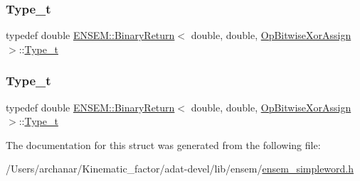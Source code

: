 \mbox{\label{structENSEM_1_1BinaryReturn_3_01double_00_01double_00_01OpBitwiseXorAssign_01_4_abd2a3f0619e394d328f98f130fc26e87}} 
\subsubsection{\texorpdfstring{Type\_t}{Type\_t}\hspace{0.1cm}{\footnotesize\ttfamily [2/3]}}
{\footnotesize\ttfamily typedef double \mbox{\hyperlink{structENSEM_1_1BinaryReturn}{E\+N\+S\+E\+M\+::\+Binary\+Return}}$<$ double, double, \mbox{\hyperlink{structENSEM_1_1OpBitwiseXorAssign}{Op\+Bitwise\+Xor\+Assign}} $>$\+::\mbox{\hyperlink{structENSEM_1_1BinaryReturn_3_01double_00_01double_00_01OpBitwiseXorAssign_01_4_abd2a3f0619e394d328f98f130fc26e87}{Type\+\_\+t}}}

\mbox{\label{structENSEM_1_1BinaryReturn_3_01double_00_01double_00_01OpBitwiseXorAssign_01_4_abd2a3f0619e394d328f98f130fc26e87}} 
\subsubsection{\texorpdfstring{Type\_t}{Type\_t}\hspace{0.1cm}{\footnotesize\ttfamily [3/3]}}
{\footnotesize\ttfamily typedef double \mbox{\hyperlink{structENSEM_1_1BinaryReturn}{E\+N\+S\+E\+M\+::\+Binary\+Return}}$<$ double, double, \mbox{\hyperlink{structENSEM_1_1OpBitwiseXorAssign}{Op\+Bitwise\+Xor\+Assign}} $>$\+::\mbox{\hyperlink{structENSEM_1_1BinaryReturn_3_01double_00_01double_00_01OpBitwiseXorAssign_01_4_abd2a3f0619e394d328f98f130fc26e87}{Type\+\_\+t}}}



The documentation for this struct was generated from the following file\+:\begin{DoxyCompactItemize}
\item 
/\+Users/archanar/\+Kinematic\+\_\+factor/adat-\/devel/lib/ensem/\mbox{\hyperlink{adat-devel_2lib_2ensem_2ensem__simpleword_8h}{ensem\+\_\+simpleword.\+h}}\end{DoxyCompactItemize}
